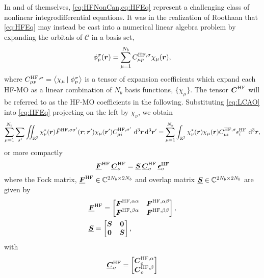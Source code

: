 In and of themselves, \cref{eq:HFNonCan,eq:HFEq} represent a challenging class of nonlinear integrodifferential equations. It was in the
realization of Roothaan  that \cref{eq:HFEq} may instead be cast into a numerical linear algebra problem by expanding the
orbitals of $\mathcal{C}$ in a basis set,
\begin{equation}
\label{eq:LCAO}
\phi^\sigma_p(\boldsymbol{r}) = \sum_{\mu = 1}^{N_b} C^{\mathrm{HF},\sigma}_{\mu p} \chi_\mu(\boldsymbol{r}),
\end{equation}
where $C^{\mathrm{HF},\sigma}_{\mu p} = \left\langle \chi_\mu \left\vert\right. \phi^\sigma_p \right\rangle$ is a tensor of expansion coefficients which expand each HF-MO as a linear 
combination of $N_b$ basis functions, $\{\chi_\mu\}$. The tensor $\boldsymbol{C}^{\mathrm{HF}}$ will be referred to as the HF-MO coefficients in the following.
Substituting \cref{eq:LCAO} into \cref{eq:HFEq} projecting on the left by $\chi_\nu$, we obtain
\begin{equation}
 \sum_{\mu = 1}^{N_b} \sum_{\sigma'} \int\mkern-12mu\int_{\mathbb R^3} \chi^*_\nu(\boldsymbol{r}) \hat{F}^{\mathrm{HF},\sigma\sigma'}(\boldsymbol{r}; \boldsymbol{r}') \chi_\mu(\boldsymbol{r}') C_{\mu i}^{\mathrm{HF},\sigma'}  
   \,\,\mathrm{d}^3\boldsymbol{r}\,\mathrm{d}^3\boldsymbol{r}' = \sum_{\mu = 1}^{N_b} \int_{\mathbb R^3} \chi^*_\nu(\boldsymbol{r}) \chi_\mu(\boldsymbol{r}) C_{\mu i}^{\mathrm{HF},\sigma} \epsilon^{\mathrm{HF}}_i \,\,\mathrm{d}^3\boldsymbol{r},
\end{equation}
or more compactly
\begin{equation}
\label{eq:OccRHEq}
\boldsymbol{\underline{F}}^{\mathrm{HF}} \,\boldsymbol{\underline{C}}^{\mathrm{HF}}_o = \boldsymbol{\underline{S}}\, \boldsymbol{\underline{C}}^{\mathrm{HF}}_o\, \boldsymbol{\underline{\epsilon}}_o^{\mathrm{HF}}
\end{equation}
where the Fock matrix, $\boldsymbol{\underline{F}}^{\mathrm{HF}} \in \mathbb{C}^{2N_b \times 2N_b}$ and overlap matrix $\boldsymbol{\underline{S}} \in \mathbb{C}^{2N_b \times 2N_b}$
are given by
\begin{align}
&\boldsymbol{\underline{F}}^{\mathrm{HF}} = \begin{bmatrix} \boldsymbol{F}^{\mathrm{HF},{\alpha\alpha}} & \boldsymbol{F}^{\mathrm{HF},{\alpha\beta}} \\ \boldsymbol{F}^{\mathrm{HF},{\beta\alpha}} & \boldsymbol{F}^{\mathrm{HF},{\beta\beta}} \end{bmatrix}, 
  \label{eq:GenHFFock}\\
&\boldsymbol{\underline{S}} = \begin{bmatrix} \boldsymbol{S} & \boldsymbol{0} \\ \boldsymbol{0} & \boldsymbol{S} \end{bmatrix},
\end{align}
with
\begin{equation}
  \boldsymbol{\underline{C}}_o^{\mathrm{HF}} = \begin{bmatrix} \boldsymbol{C}_o^{\mathrm{HF},\alpha} \\ \boldsymbol{C}_o^{\mathrm{HF},\beta} \end{bmatrix}
\end{equation}
